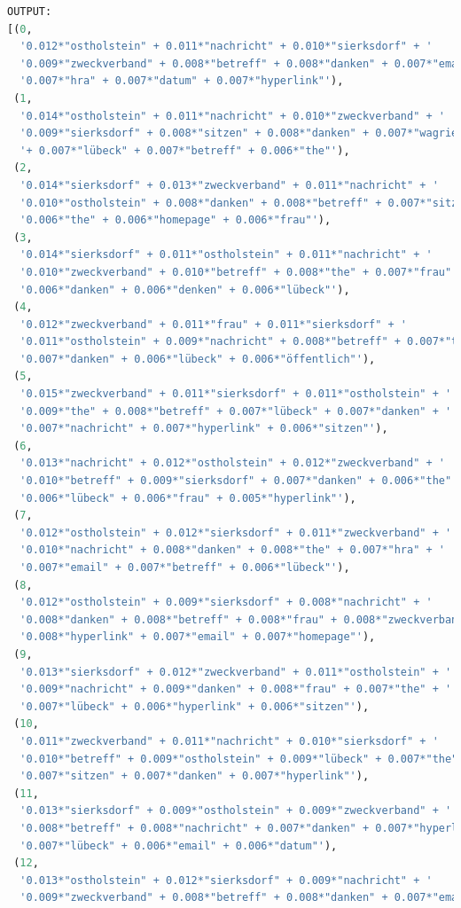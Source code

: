 \documentclass[german,version-2020-11]{uzl-thesis}
\begin{document}
\begin{enumerate}
\begin{lstlisting}[language=Python, basicstyle=\small]
OUTPUT:
[(0,
  '0.012*"ostholstein" + 0.011*"nachricht" + 0.010*"sierksdorf" + '
  '0.009*"zweckverband" + 0.008*"betreff" + 0.008*"danken" + 0.007*"email" + '
  '0.007*"hra" + 0.007*"datum" + 0.007*"hyperlink"'),
 (1,
  '0.014*"ostholstein" + 0.011*"nachricht" + 0.010*"zweckverband" + '
  '0.009*"sierksdorf" + 0.008*"sitzen" + 0.008*"danken" + 0.007*"wagrienring" '
  '+ 0.007*"lübeck" + 0.007*"betreff" + 0.006*"the"'),
 (2,
  '0.014*"sierksdorf" + 0.013*"zweckverband" + 0.011*"nachricht" + '
  '0.010*"ostholstein" + 0.008*"danken" + 0.008*"betreff" + 0.007*"sitzen" + '
  '0.006*"the" + 0.006*"homepage" + 0.006*"frau"'),
 (3,
  '0.014*"sierksdorf" + 0.011*"ostholstein" + 0.011*"nachricht" + '
  '0.010*"zweckverband" + 0.010*"betreff" + 0.008*"the" + 0.007*"frau" + '
  '0.006*"danken" + 0.006*"denken" + 0.006*"lübeck"'),
 (4,
  '0.012*"zweckverband" + 0.011*"frau" + 0.011*"sierksdorf" + '
  '0.011*"ostholstein" + 0.009*"nachricht" + 0.008*"betreff" + 0.007*"the" + '
  '0.007*"danken" + 0.006*"lübeck" + 0.006*"öffentlich"'),
 (5,
  '0.015*"zweckverband" + 0.011*"sierksdorf" + 0.011*"ostholstein" + '
  '0.009*"the" + 0.008*"betreff" + 0.007*"lübeck" + 0.007*"danken" + '
  '0.007*"nachricht" + 0.007*"hyperlink" + 0.006*"sitzen"'),
 (6,
  '0.013*"nachricht" + 0.012*"ostholstein" + 0.012*"zweckverband" + '
  '0.010*"betreff" + 0.009*"sierksdorf" + 0.007*"danken" + 0.006*"the" + '
  '0.006*"lübeck" + 0.006*"frau" + 0.005*"hyperlink"'),
 (7,
  '0.012*"ostholstein" + 0.012*"sierksdorf" + 0.011*"zweckverband" + '
  '0.010*"nachricht" + 0.008*"danken" + 0.008*"the" + 0.007*"hra" + '
  '0.007*"email" + 0.007*"betreff" + 0.006*"lübeck"'),
 (8,
  '0.012*"ostholstein" + 0.009*"sierksdorf" + 0.008*"nachricht" + '
  '0.008*"danken" + 0.008*"betreff" + 0.008*"frau" + 0.008*"zweckverband" + '
  '0.008*"hyperlink" + 0.007*"email" + 0.007*"homepage"'),
 (9,
  '0.013*"sierksdorf" + 0.012*"zweckverband" + 0.011*"ostholstein" + '
  '0.009*"nachricht" + 0.009*"danken" + 0.008*"frau" + 0.007*"the" + '
  '0.007*"lübeck" + 0.006*"hyperlink" + 0.006*"sitzen"'),
 (10,
  '0.011*"zweckverband" + 0.011*"nachricht" + 0.010*"sierksdorf" + '
  '0.010*"betreff" + 0.009*"ostholstein" + 0.009*"lübeck" + 0.007*"the" + '
  '0.007*"sitzen" + 0.007*"danken" + 0.007*"hyperlink"'),
 (11,
  '0.013*"sierksdorf" + 0.009*"ostholstein" + 0.009*"zweckverband" + '
  '0.008*"betreff" + 0.008*"nachricht" + 0.007*"danken" + 0.007*"hyperlink" + '
  '0.007*"lübeck" + 0.006*"email" + 0.006*"datum"'),
 (12,
  '0.013*"ostholstein" + 0.012*"sierksdorf" + 0.009*"nachricht" + '
  '0.009*"zweckverband" + 0.008*"betreff" + 0.008*"danken" + 0.007*"email" + '

\end{lstlisting}
\end{enumerate}
\end{document}
